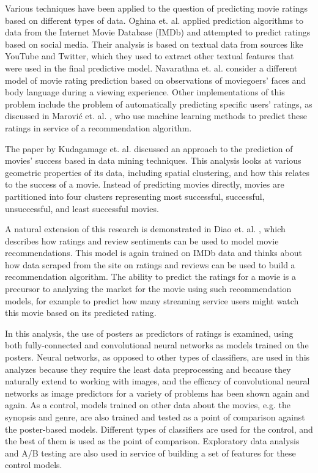 \documentclass[12pt, oneside]{article}   	%
\begin{document}
Various techniques have been applied to the question of predicting movie ratings based on different types of data. Oghina et. al. \cite{oghina_predicting_2012} applied prediction algorithms to data from the Internet Movie Database (IMDb) and attempted to predict ratings based on social media. Their analysis is based on textual data from sources like YouTube and Twitter, which they used to extract other textual features that were used in the final predictive model. Navarathna et. al. \cite{navarathna_predicting_2014} consider a different model of movie rating prediction based on observations of moviegoers' faces and body language during a viewing experience. Other implementations of this problem include the problem of automatically predicting specific users' ratings, as discussed in Marović et. al. \cite{marovic_automatic_2011}, who use machine learning methods to predict these ratings in service of a recommendation algorithm.

The paper by Kudagamage et. al. \cite{kudagamage_data_2018} discussed an approach to the prediction of movies' success based in data mining techniques. This analysis looks at various geometric properties of its data, including spatial clustering, and how this relates to the success of a movie. Instead of predicting movies directly, movies are partitioned into four clusters representing most successful, successful, unsuccessful, and least successful movies. 

A natural extension of this research is demonstrated in Diao et. al. \cite{diao_jointly_2014}, which describes how ratings and review sentiments can be used to model movie recommendations. This model is again trained on IMDb data and thinks about how data scraped from the site on ratings and reviews can be used to build a recommendation algorithm. The ability to predict the ratings for a movie is a precursor to analyzing the market for the movie using such recommendation models, for example to predict how many streaming service users might watch this movie based on its predicted rating. 

In this analysis, the use of posters as predictors of ratings is examined, using both fully-connected and convolutional neural networks as models trained on the posters. Neural networks, as opposed to other types of classifiers, are used in this analyzes because they require the least data preprocessing and because they naturally extend to working with images, and the efficacy of convolutional neural networks as image predictors for a variety of problems has been shown again and again. As a control, models trained on other data about the movies, e.g. the synopsis and genre, are also trained and tested as a point of comparison against the poster-based models. Different types of classifiers are used for the control, and the best of them is used as the point of comparison. Exploratory data analysis and A/B testing are also used in service of building a set of features for these control models.
\end{document}
